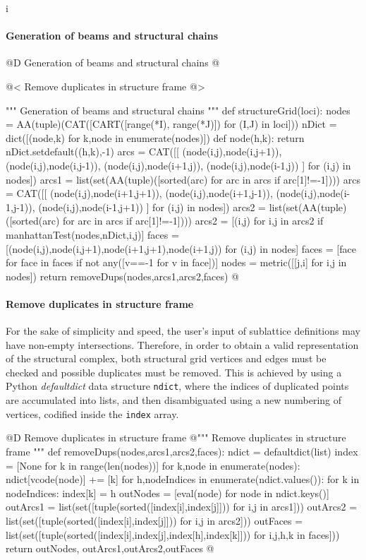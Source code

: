 i\documentclass[11pt,oneside]{article}    %
\begin{document}
\paragraph{Generation of beams and structural chains}
@D Generation of beams and structural chains @{
@< Remove duplicates in structure frame @>

""" Generation of beams and structural chains """
def structureGrid(loci):
    nodes = AA(tuple)(CAT([CART([range(*I), range(*J)]) for (I,J) in loci]))
    nDict = dict([(node,k) for k,node in enumerate(nodes)])
    def node(h,k): return nDict.setdefault((h,k),-1)
    arcs = CAT([[ (node(i,j),node(i,j+1)), (node(i,j),node(i,j-1)),
        (node(i,j),node(i+1,j)), (node(i,j),node(i-1,j)) ] for (i,j) in nodes])
    arcs1 = list(set(AA(tuple)([sorted(arc) for arc in arcs if arc[1]!=-1])))
    arcs = CAT([[ (node(i,j),node(i+1,j+1)), (node(i,j),node(i+1,j-1)),
        (node(i,j),node(i-1,j-1)), (node(i,j),node(i-1,j+1)) ] for (i,j) in nodes])
    arcs2 = list(set(AA(tuple)([sorted(arc) for arc in arcs if arc[1]!=-1])))
    arcs2 = [(i,j) for i,j in arcs2 if manhattanTest(nodes,nDict,i,j)]
    faces = [(node(i,j),node(i,j+1),node(i+1,j+1),node(i+1,j)) for (i,j) in nodes]
    faces = [face for face in faces if not any([v==-1 for v in face])]
    nodes = metric([[j,i] for i,j in nodes])
    return removeDups(nodes,arcs1,arcs2,faces)
@}


\paragraph{Remove duplicates in structure frame}

For the sake of simplicity and speed, the user's input of sublattice definitions may have non-empty intersections. Therefore, in order to obtain a valid representation of the structural complex, both structural grid vertices and edges must be checked and possible duplicates must be removed. This is achieved by using a Python \emph{defaultdict} data structure \texttt{ndict}, where the indices of duplicated points are accumulated into lists, and then disambiguated using a new numbering of  vertices, codified inside the \texttt{index} array.

@D Remove duplicates in structure frame 
@{""" Remove duplicates in structure frame """
def removeDups(nodes,arcs1,arcs2,faces):
    ndict = defaultdict(list)
    index = [None for k in range(len(nodes))]
    for k,node in enumerate(nodes):
        ndict[vcode(node)] += [k]
    for h,nodeIndices in enumerate(ndict.values()):
        for k in nodeIndices:
            index[k] = h
    outNodes = [eval(node) for node in ndict.keys()]
    outArcs1 = list(set([tuple(sorted([index[i],index[j]])) for i,j in arcs1]))
    outArcs2 = list(set([tuple(sorted([index[i],index[j]])) for i,j in arcs2]))
    outFaces = list(set([tuple(sorted([index[i],index[j],index[h],index[k]])) 
        for i,j,h,k in faces]))
    return outNodes, outArcs1,outArcs2,outFaces
@}
\end{document}
